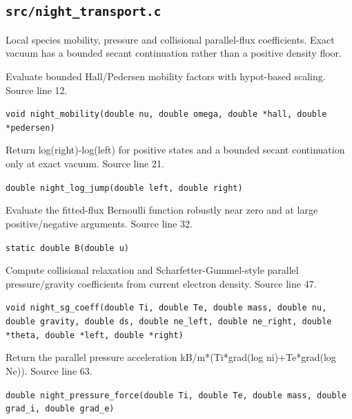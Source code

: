\subsection{\texttt{src/night\_transport.c}}
Local species mobility, pressure and collisional parallel-flux coefficients. Exact vacuum has a bounded secant continuation rather than a positive density floor.
\begin{description}[style=nextline,leftmargin=0pt,labelindent=0pt,labelwidth=0pt,labelsep=0pt]
\item[\texttt{night\_mobility}] Evaluate bounded Hall/Pedersen mobility factors with hypot-based scaling. Source line 12.\par
{\small\nolinkurl{void night_mobility(double nu, double omega, double *hall, double *pedersen)}}
\item[\texttt{night\_log\_jump}] Return log(right)-log(left) for positive states and a bounded secant continuation only at exact vacuum. Source line 21.\par
{\small\nolinkurl{double night_log_jump(double left, double right)}}
\item[\texttt{B}] Evaluate the fitted-flux Bernoulli function robustly near zero and at large positive/negative arguments. Source line 32.\par
{\small\nolinkurl{static double B(double u)}}
\item[\texttt{night\_sg\_coeff}] Compute collisional relaxation and Scharfetter-Gummel-style parallel pressure/gravity coefficients from current electron density. Source line 47.\par
{\small\nolinkurl{void night_sg_coeff(double Ti, double Te, double mass, double nu, double gravity, double ds, double ne_left, double ne_right, double *theta, double *left, double *right)}}
\item[\texttt{night\_pressure\_force}] Return the parallel pressure acceleration kB/m*(Ti*grad(log ni)+Te*grad(log Ne)). Source line 63.\par
{\small\nolinkurl{double night_pressure_force(double Ti, double Te, double mass, double grad_i, double grad_e)}}
\end{description}

